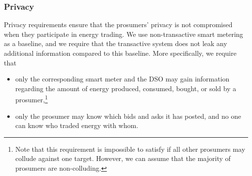 \subsubsection{Privacy} 
Privacy requirements ensure that the prosumers' privacy is not
compromised when they participate in energy trading.  We use
non-transactive smart metering as a baseline, and we require that
the transactive system does not leak any additional information
compared to this baseline.  More specifically, we require that
\begin{itemize}[noitemsep,topsep=-\parskip]
\item only the corresponding smart meter and the DSO may gain
  information regarding the amount of energy produced, consumed,
  bought, or sold by a prosumer,\footnote{Note that this requirement
    is impossible to satisfy if all other prosumers may collude
    against one target. However, we can assume that the majority of
    prosumers are non-colluding.}
\item only the prosumer may know which bids and asks it has posted,
  and no one can know who traded energy with whom.
\end{itemize}


